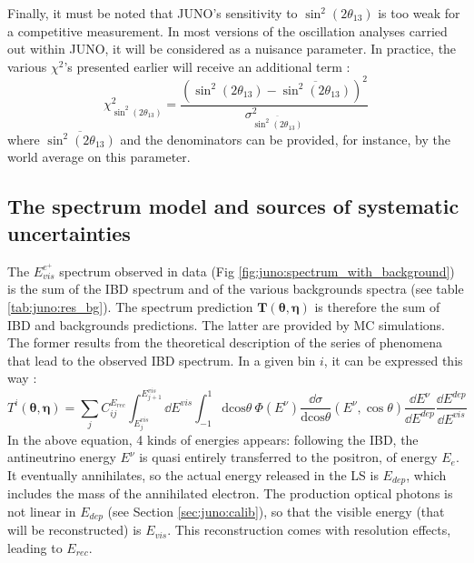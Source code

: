 \documentclass[../main.tex]{subfiles}
\begin{document}
Finally, it must be noted that JUNO's sensitivity to $\sin^2(2\theta_{13})$ is too weak for a competitive measurement. In most versions of the oscillation analyses carried out within JUNO, it will be considered as a nuisance parameter. In practice, the various $\chi^2$'s presented earlier will receive an additional term :
\begin{equation}
  \chi^2_{\sin^2(2\theta_{13})} = \frac{(\sin^2(2\theta_{13})-\overline{\sin^2(2\theta_{13})})^2}{\sigma^2_{\overline{\sin^2(2\theta_{13})}}}
\end{equation}
where $\overline{\sin^2(2\theta_{13})}$ and the denominators can be provided, for instance, by the world average on this parameter.

\subsection{The spectrum model and sources of systematic uncertainties}

The $E^{e^+}_{vis}$ spectrum observed in data (Fig \ref{fig:juno:spectrum_with_background}) is the sum of the IBD spectrum and of the various backgrounds spectra (see table \ref{tab:juno:res_bg}).
The spectrum prediction $\bm{T}\left(\bm{\theta},\bm{\eta}\right)$ is therefore the sum of IBD and backgrounds predictions. The latter are provided by MC simulations. The former results from the theoretical description of the series of phenomena that lead to the observed IBD spectrum. In a given bin $i$, it can be expressed this way :
\begin{equation}
  \label{eq:juno:bin_content}
  T^i(\bm{\theta},\bm{\eta}) =\sum_{j} C_{ij}^{E_{rec}} \int_{E^{vis}_{j}}^{E^{vis}_{j+1}} \dd E^{vis} \int_{-1}^{1} \mathrm{dcos}\theta ~ \Phi(E^{\nu}) \frac{\dd\sigma}{\mathrm{dcos}\theta}(E^{\nu}, \cos\theta) \frac{\dd E^{\nu}}{\dd E^{dep}} \frac{\dd E^{dep}}{\dd E^{vis}}
\end{equation}
In the above equation, 4 kinds of energies appears: following the IBD, the antineutrino energy $E^{\nu}$ is quasi entirely transferred to the positron, of energy $E_{e}$. It eventually annihilates, so the actual energy released in the LS is $E_{dep}$, which includes the mass of the annihilated electron. The production optical photons is not linear in $E_{dep}$ (see Section \ref{sec:juno:calib}), so that the visible energy (that will be reconstructed) is $E_{vis}$. This reconstruction comes with resolution effects, leading to $E_{rec}$.
\end{document}
